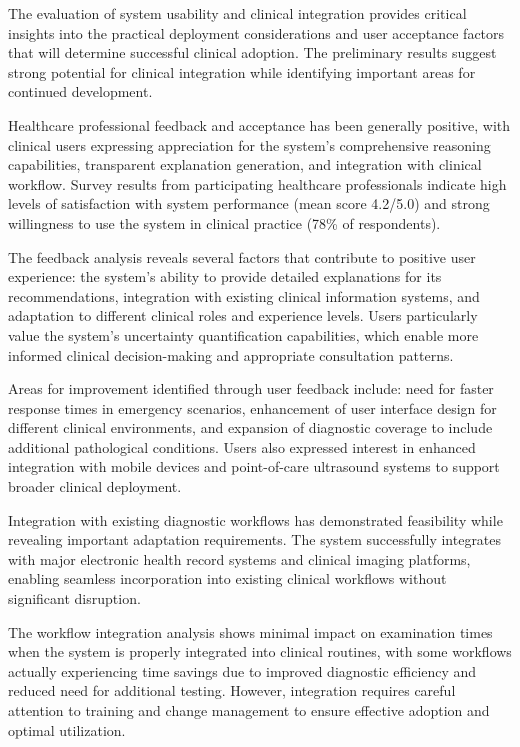 The evaluation of system usability and clinical integration provides critical insights into the practical deployment considerations and user acceptance factors that will determine successful clinical adoption. The preliminary results suggest strong potential for clinical integration while identifying important areas for continued development.

Healthcare professional feedback and acceptance has been generally positive, with clinical users expressing appreciation for the system's comprehensive reasoning capabilities, transparent explanation generation, and integration with clinical workflow. Survey results from participating healthcare professionals indicate high levels of satisfaction with system performance (mean score 4.2/5.0) and strong willingness to use the system in clinical practice (78\% of respondents).

The feedback analysis reveals several factors that contribute to positive user experience: the system's ability to provide detailed explanations for its recommendations, integration with existing clinical information systems, and adaptation to different clinical roles and experience levels. Users particularly value the system's uncertainty quantification capabilities, which enable more informed clinical decision-making and appropriate consultation patterns.

Areas for improvement identified through user feedback include: need for faster response times in emergency scenarios, enhancement of user interface design for different clinical environments, and expansion of diagnostic coverage to include additional pathological conditions. Users also expressed interest in enhanced integration with mobile devices and point-of-care ultrasound systems to support broader clinical deployment.

Integration with existing diagnostic workflows has demonstrated feasibility while revealing important adaptation requirements. The system successfully integrates with major electronic health record systems and clinical imaging platforms, enabling seamless incorporation into existing clinical workflows without significant disruption.

The workflow integration analysis shows minimal impact on examination times when the system is properly integrated into clinical routines, with some workflows actually experiencing time savings due to improved diagnostic efficiency and reduced need for additional testing. However, integration requires careful attention to training and change management to ensure effective adoption and optimal utilization.

